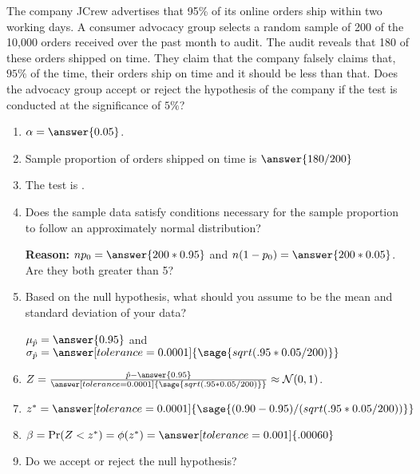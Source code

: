 \documentclass{ximera}
\begin{document}
\begin{problem}
The company JCrew advertises that 95\% of its online orders ship within two working
days. A consumer advocacy group selects a random sample of 200 of the 10,000 orders received over the past month to
audit. The audit reveals that 180 of these orders shipped on time. They claim that the company falsely claims that, $95\%$ of the time, their orders ship on time and it should be less than that. Does the advocacy group accept or reject the hypothesis of the company if the test is conducted at the significance of $5\%$?


\begin{enumerate}
    \item $\alpha=\answer{0.05}$.
    \item Sample proportion of orders shipped on time is $\answer{180/200}$
     \item The test is .
    \item Does the sample data satisfy conditions necessary for the sample proportion to follow an
approximately normal distribution?
\begin{multipleChoice}
\end{multipleChoice}
{\bf Reason:} $np_0=\answer{200*0.95}$
and $n(1-p_0)=\answer{200*0.05}$. Are they both greater than 5? 
    
    \item Based on the null hypothesis, what should you assume to be the mean and standard deviation of your data? 

$\mu_{\hat p}=\answer{0.95}$ and $\sigma_{\hat p}=\answer[tolerance=0.0001]{\sage{sqrt(.95*0.05/200)}}$
    \item $Z=\frac{\hat p -\answer{0.95}}{\answer[tolerance=0.0001]{\sage{sqrt(.95*0.05/200)}}}\approx \mathcal N(0,1)$.
    \item $z^*=\answer[tolerance=0.0001]{\sage{(0.90 -0.95)/(sqrt(.95*0.05/200))}}$
    \item $\beta=\Pr(Z<z^*)=\phi(z^*)=\answer[tolerance=0.001]{.00060}$
    \item Do we accept or reject the null hypothesis?
    \begin{multipleChoice}
    \end{multipleChoice}
\end{enumerate}
\end{problem}
\end{document}
